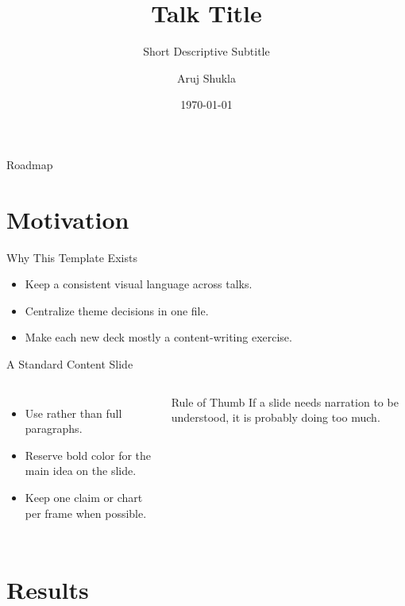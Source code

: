 \documentclass[10pt,aspectratio=169]{beamer}
\title{Talk Title}
\subtitle{Short Descriptive Subtitle}
\author{Aruj Shukla}
\institute{University or Affiliation}
\date{\today}
\begin{document}
\maketitle

\begin{frame}{Roadmap}
  \tableofcontents
\end{frame}

\section{Motivation}

\begin{frame}{Why This Template Exists}
  \begin{itemize}\tightlist
    \item Keep a consistent visual language across talks.
    \item Centralize theme decisions in one file.
    \item Make each new deck mostly a content-writing exercise.
  \end{itemize}

\end{frame}

\begin{frame}{A Standard Content Slide}
  \begin{columns}[T,onlytextwidth]
      \begin{itemize}\tightlist
        \item Use  rather than full paragraphs.
        \item Reserve bold color for the main idea on the slide.
        \item Keep one claim or chart per frame when possible.
      \end{itemize}

      \begin{block}{Rule of Thumb}
        If a slide needs narration to be understood, it is probably doing too much.
      \end{block}
  \end{columns}
\end{frame}

\section{Results}
\end{document}
